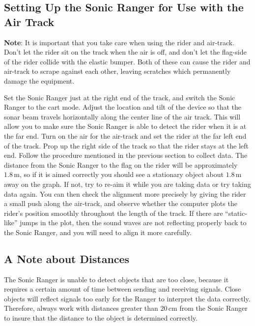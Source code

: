 \subsection{Setting Up the Sonic Ranger for Use with the Air Track}

\textbf{Note}: It is important that you take care when using the rider and air-track.  Don't let the rider sit on the track when the air is off, and don't let the flag-side of the rider collide with the elastic bumper. Both of these can cause the rider and air-track to scrape against each other, leaving scratches which permanently damage the equipment. \myskip

Set the Sonic Ranger just at the right end of the track, and switch the Sonic Ranger to the cart mode.  Adjust the location and tilt of the device so that the sonar beam travels horizontally along the center line of the air track.  This will allow you to make sure the Sonic Ranger is able to detect the rider when it is at the far end.  Turn on the air for the air-track and set the rider at the far left end of the track.   Prop up the right side of the track so that the rider stays at the left end. Follow the procedure mentioned in the previous section to collect data.  The distance from the Sonic Ranger to the flag on the rider will be approximately $1.8\,\mathrm{m}$, so if it is aimed correctly you should see a stationary object about $1.8\,\mathrm{m}$ away on the graph. If not, try to re-aim it while you are taking data or try taking data again.  You can then check the alignment more precisely by giving the rider a small push along the air-track, and observe whether the computer plots the rider's position smoothly throughout the length of the track.  If there are ``static-like'' jumps in the plot, then the sound waves are not reflecting properly back to the Sonic Ranger, and you will need to align it more carefully.

\subsection{A Note about Distances}

The Sonic Ranger is unable to detect objects that are too close, because it requires a certain amount of time between sending and receiving signals.  Close objects will reflect signals too early for the Ranger to interpret the data correctly.  Therefore, always work with distances greater than $20\,\mathrm{cm}$ from the Sonic Ranger to insure that the distance to the object is determined correctly. \myskip

